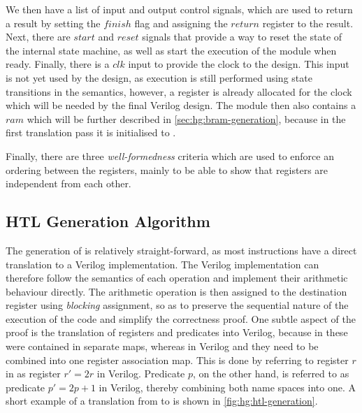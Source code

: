 We then have a list of input and output control signals, which are used to
return a result by setting the $\mathit{finish}$ flag and assigning the
$\mathit{return}$ register to the result.  Next, there are $\mathit{start}$ and
$\mathit{reset}$ signals that provide a way to reset the state of the internal
state machine, as well as start the execution of the module when ready.
Finally, there is a $\mathit{clk}$ input to provide the clock to the design.
This input is not yet used by the \htl{} design, as execution is still performed
using state transitions in the semantics, however, a register is already
allocated for the clock which will be needed by the final Verilog design.  The
module then also contains a $\mathit{ram}$ which will be further described in
\cref{sec:hg:bram-generation}, because in the first translation pass it is
initialised to \cnone.

Finally, there are three \emph{well-formedness} criteria which are used to
enforce an ordering between the registers, mainly to be able to show that
registers are independent from each other.

\subsection{HTL Generation Algorithm}%
\label{sec:hg:htl-generation}

The generation of \htl{} is relatively straight-forward, as most instructions
have a direct translation to a Verilog implementation.  The Verilog
implementation can therefore follow the semantics of each operation and
implement their arithmetic behaviour directly.  The arithmetic operation is then
assigned to the destination register using \emph{blocking} assignment, so as to
preserve the sequential nature of the execution of the code and simplify the
correctness proof.  One subtle aspect of the proof is the translation of
registers and predicates into Verilog, because in \rtlsubpar{} these were
contained in separate maps, whereas in Verilog and \htl{} they need to be
combined into one register association map.  This is done by referring to
register $r$ in \rtlsubpar{} as register $r' = 2r$ in Verilog.  Predicate $p$,
on the other hand, is referred to as predicate $p' = 2p + 1$ in Verilog, thereby
combining both name spaces into one.  A short example of a translation from
\rtlsubpar{} to \htl{} is shown in \cref{fig:hg:htl-generation}.

